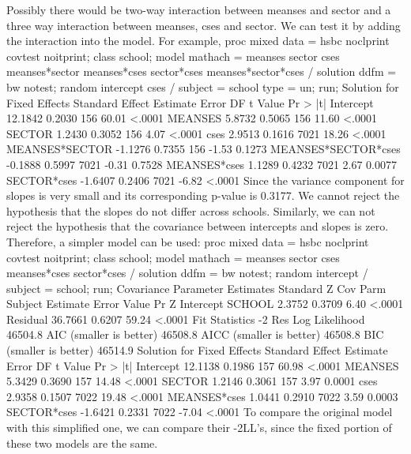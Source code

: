 Possibly there would be two-way interaction between meanses and sector and a three way interaction between meanses, cses and sector. We can test it by adding the interaction into the model. For example,
proc mixed data = hsbc noclprint covtest noitprint;
  class school;
  model mathach = meanses sector cses meanses*sector 
                  meanses*cses sector*cses meanses*sector*cses 
                  / solution ddfm = bw notest;
  random intercept cses / subject = school type = un;
run;
                        Solution for Fixed Effects
                                   Standard
Effect                 Estimate       Error      DF    t Value    Pr > |t|
Intercept               12.1842      0.2030     156      60.01      <.0001
MEANSES                  5.8732      0.5065     156      11.60      <.0001
SECTOR                   1.2430      0.3052     156       4.07      <.0001
cses                     2.9513      0.1616    7021      18.26      <.0001
MEANSES*SECTOR          -1.1276      0.7355     156      -1.53      0.1273
MEANSES*SECTOR*cses     -0.1888      0.5997    7021      -0.31      0.7528
MEANSES*cses             1.1289      0.4232    7021       2.67      0.0077
SECTOR*cses             -1.6407      0.2406    7021      -6.82      <.0001
Since the variance component for slopes is very small and its corresponding p-value is 0.3177. We cannot reject the hypothesis that the slopes do not differ across schools. Similarly, we can not reject the hypothesis that the covariance between intercepts and slopes is zero. Therefore, a simpler model can be used:
proc mixed data = hsbc noclprint covtest noitprint;
  class school;
  model mathach = meanses sector cses meanses*cses sector*cses / solution ddfm = bw notest;
  random intercept / subject = school;
run;
                  Covariance Parameter Estimates
                                     Standard         Z
Cov Parm      Subject    Estimate       Error     Value        Pr Z
Intercept     SCHOOL       2.3752      0.3709      6.40      <.0001
Residual                  36.7661      0.6207     59.24      <.0001
           Fit Statistics
-2 Res Log Likelihood         46504.8
AIC (smaller is better)       46508.8
AICC (smaller is better)      46508.8
BIC (smaller is better)       46514.9
                    Solution for Fixed Effects
                            Standard
Effect          Estimate       Error      DF    t Value    Pr > |t|
Intercept        12.1138      0.1986     157      60.98      <.0001
MEANSES           5.3429      0.3690     157      14.48      <.0001
SECTOR            1.2146      0.3061     157       3.97      0.0001
cses              2.9358      0.1507    7022      19.48      <.0001
MEANSES*cses      1.0441      0.2910    7022       3.59      0.0003
SECTOR*cses      -1.6421      0.2331    7022      -7.04      <.0001
To compare the original model with this simplified one, we can compare their -2LL's, since the fixed portion of these two models are the same.

